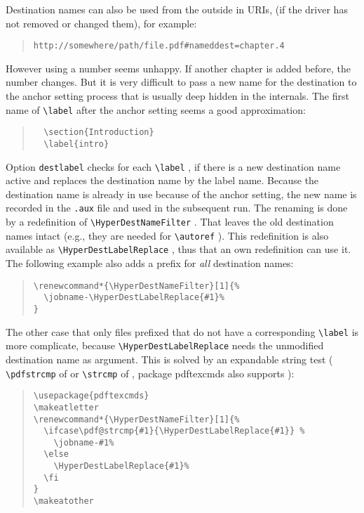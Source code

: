 \documentclass{article}
\newcommand*{\cs}[1]{%
  \texttt{\textbackslash #1}%
}
\newcommand*{\xpackage}[1]{\textsf{#1}}
\begin{document}
Destination names can also be used from the outside in URIs, (if the
driver has not removed or changed them), for example:
\begin{quote}
\begin{verbatim}
http://somewhere/path/file.pdf#nameddest=chapter.4
\end{verbatim}
\end{quote}
However using a number seems unhappy. If another chapter is added
before, the number changes. But it is very difficult to pass
a new name for the destination to the anchor setting process that
is usually deep hidden in the internals. The first name of
\cs{label} after the anchor setting seems a good approximation:
\begin{quote}
\begin{verbatim}
  \section{Introduction}
  \label{intro}
\end{verbatim}
\end{quote}
Option \texttt{destlabel} checks for each \cs{label}, if there is
a new destination name active and replaces the destination
name by the label name. Because the destination name is already in use
because of the anchor setting, the new name is recorded in the \texttt{.aux}
file and used in the subsequent  run. The renaming is done by
a redefinition of \cs{HyperDestNameFilter}. That leaves the old
destination names intact (e.g., they are needed for \cs{autoref}).
This redefinition is also available as \cs{HyperDestLabelReplace},
thus that an own redefinition can use it.
The following example also adds a prefix for \emph{all} destination names:
\begin{quote}
\begin{verbatim}
\renewcommand*{\HyperDestNameFilter}[1]{%
  \jobname-\HyperDestLabelReplace{#1}%
}
\end{verbatim}
\end{quote}
The other case that only files prefixed that do not have a corresponding
\cs{label} is more complicate, because \cs{HyperDestLabelReplace} needs
the unmodified destination name as argument. This is solved by an
expandable string test (\cs{pdfstrcmp} of 
or \cs{strcmp} of , package \xpackage{pdftexcmds} also supports
):
\begin{quote}
\begin{verbatim}
\usepackage{pdftexcmds}
\makeatletter
\renewcommand*{\HyperDestNameFilter}[1]{%
  \ifcase\pdf@strcmp{#1}{\HyperDestLabelReplace{#1}} %
    \jobname-#1%
  \else
    \HyperDestLabelReplace{#1}%
  \fi
}
\makeatother
\end{verbatim}
\end{quote}
\end{document}
